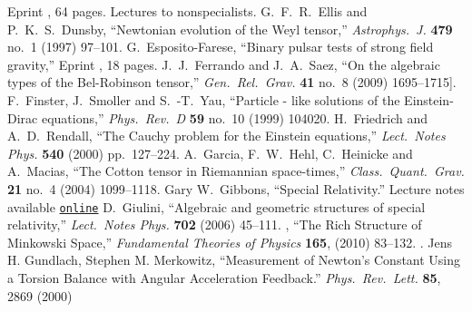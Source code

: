 \begin{thebibliography}{99}
  Eprint , 64 pages.\newblock
  Lectures to nonspecialists.
  G.~F.~R.~Ellis and P.~K.~S.~Dunsby,\newblock
  ``Newtonian evolution of the Weyl tensor,''\newblock
  \emph{Astrophys.\ J.} {\bf 479} no.~1 (1997) 97--101.
  G.~Esposito-Farese,\newblock
  ``Binary pulsar tests of strong field gravity,''\newblock
  Eprint , 18 pages.
  J.~J.~Ferrando and J.~A.~Saez,\newblock
  ``On the algebraic types of the Bel-Robinson tensor,''\newblock
  \emph{Gen.\ Rel.\ Grav.} {\bf 41} no.~8 (2009) 1695--1715\newblock
  [\arXiv[gr-qc]{0807.0181}].
  F.~Finster, J.~Smoller and S.~-T.~Yau,\newblock
  ``Particle - like solutions of the Einstein-Dirac equations,''\newblock
  \emph{Phys.\ Rev.\ D} {\bf 59} no.~10 (1999) 104020\newblock
  [\arXiv{gr-qc/9801079}].
  H.~Friedrich and A.~D.~Rendall,\newblock
  ``The Cauchy problem for the Einstein equations,''\newblock
  \emph{Lect.\ Notes Phys.}  {\bf 540} (2000) pp.~127--224\newblock
  [\arXiv{gr-qc/0002074}].
  A.~Garcia, F.~W.~Hehl, C.~Heinicke and A.~Macias,\newblock
  ``The Cotton tensor in Riemannian space-times,''\newblock
  \emph{Class.\ Quant.\ Grav.}  {\bf 21} no.~4 (2004) 1099--1118\newblock
  [\arXiv{gr-qc/0309008}].
  Gary W.\ Gibbons,\newblock
  ``Special Relativity.''\newblock
  Lecture notes available {\tt\href{http://www.damtp.cam.ac.uk/research/gr/members/gibbons/gwgPartI_SpecialRelativity2010.pdf}{online}}
  D.~Giulini,\newblock
  ``Algebraic and geometric structures of special relativity,''\newblock
  \emph{Lect.\ Notes Phys.} {\bf 702} (2006) 45--111.
  \bysame,\newblock%
  ``The Rich Structure of Minkowski Space,''\newblock
  \emph{Fundamental Theories of Physics} {\bf 165}, (2010) 83--132.\newblock
  .
  Jens H. Gundlach, Stephen M. Merkowitz, \newblock
  ``Measurement of Newton's Constant Using a Torsion Balance with Angular Acceleration Feedback.''\newblock
  \emph{Phys.\ Rev.\ Lett.}  {\bf 85}, 2869 (2000)\newblock

\end{thebibliography}
